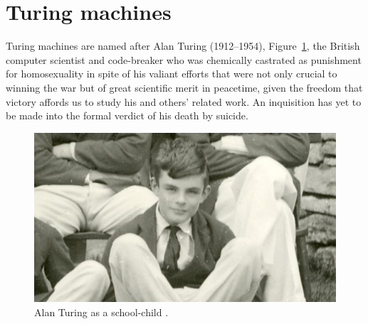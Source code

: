 \documentclass[letterpaper]{article}
\begin{document}
\section{Turing machines}
Turing machines are named after Alan Turing (1912--1954), Figure~\ref{turing}, the British computer scientist and code-breaker who was chemically castrated as punishment for homosexuality in spite of his valiant efforts that were not only crucial to winning the war but of great scientific merit in peacetime, given the freedom that victory affords us to study his and others' related work.  An inquisition has yet to be made into the formal verdict of his death by suicide.
\begin{figure}
	\centering
	\includegraphics[width=1\textwidth]{alan-turing-school-photo.jpg}
	\caption[Alan Turing]{Alan Turing as a school-child \cite{hodges2017}.}
	\label{turing}
\end{figure}
\end{document}
